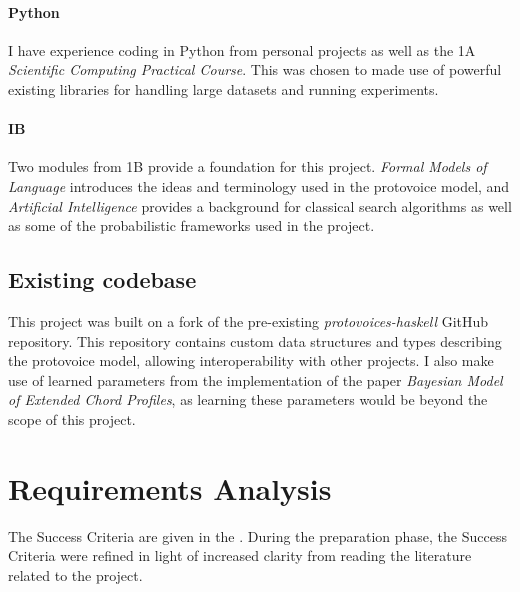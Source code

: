 \documentclass[12pt,a4paper,twoside,openright]{report} \usepackage[pdfborder={0 0 0}]{hyperref}    %
\theoremstyle{definition} \newtheorem{definition}{Definition}[section]
\begin{document}
\paragraph{Python}{I have experience coding in Python from personal projects as well as the 1A \textit{Scientific
Computing Practical Course}. This was chosen to made use of powerful existing libraries for handling large datasets and
running experiments. }

\paragraph{IB}{ Two modules from 1B provide a foundation for this project. \textit{Formal Models of Language} introduces
the ideas and terminology used in the protovoice model, and \textit{Artificial Intelligence} provides a background for
classical search algorithms as well as some of the probabilistic frameworks used in the project.}

\subsection{Existing codebase} This project was built on a fork of the pre-existing \textit{protovoices-haskell} GitHub
repository. This repository contains custom data structures and types describing the protovoice model, allowing
interoperability with other projects. I also make use of learned parameters from the implementation of the paper
\textit{Bayesian Model of Extended Chord Profiles}\cite{finkensiepChordTypesOrnamentation2023}, as learning these
parameters would be beyond the scope of this project. 

\section{Requirements Analysis}
The Success Criteria are given in the . During the preparation phase, the Success Criteria were
refined in light of increased clarity from reading the literature related to the project. 
\end{document}

